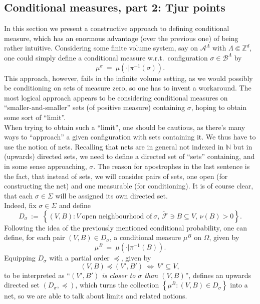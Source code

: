 \documentclass[12pt]{article}
\newcommand{\A}{\mathcal{A}}
\newcommand{\B}{\mathcal{B}}
\newcommand{\F}{\mathcal{F}}
\newcommand{\N}{\mathbb{N}}
\newcommand{\Z}{\mathbb{Z}}
\newcommand{\set}[1]{\left\{#1\right\}}
\newcommand{\pika}{\boldsymbol{\cdot}}
\newcommand{\1}{\mathbbm{1}}
\newcommand{\5}{\vspace{0.5cm}}
\renewcommand{\tilde}{\widetilde}
\theoremstyle{definition}
\begin{document}

\subsection{Conditional measures, part 2: Tjur points}\label{sec:2.3}

In this section we present a constructive approach to defining conditional measure, which has an enormous advantage (over the previous one) of being rather intuitive. Considering some finite volume system, say on $\A^\Lambda$ with $\Lambda\Subset\Z^d$, one could simply define a conditional measure w.r.t.~configuration $\sigma\in\B^\Lambda$ by
$$\mu^\sigma ~=~ \mu(\pika|\pi^{-1}(\sigma)).$$
This approach, however, fails in the infinite volume setting, as we would possibly be conditioning on sets of measure zero, so one has to invent a workaround. The most logical approach appears to be considering conditional measures on ``smaller-and-smaller'' sets (of positive measure) containing $\sigma$, hoping to obtain some sort of ``limit''. \\

When trying to obtain such a ``limit'', one should be cautious, as there's many ways to ``approach'' a given configuration with sets containing it. We thus have to use the notion of nets. Recalling that nets are in general not indexed in $\N$ but in (upwards) directed sets, we need to define a directed set of ``sets'' containing, and in some sense approaching, $\sigma$. The reason for apostrophes in the last sentence is the fact, that instead of sets, we will consider pairs of sets, one open (for constructing the net) and one measurable (for conditioning). It is of course clear, that each $\sigma\in\Sigma$ will be assigned its own directed set.\\

Indeed, fix $\sigma\in\Sigma$ and define
$$D_{\sigma} ~:=~ \set{(V,B):V~\text{open neighbourhood of}~\sigma,\,\tilde{\F}\ni B\subseteq V,\,\nu(B)>0}.$$
Following the idea of the previously mentioned conditional probability, one can define, for each pair $(V,B)\in D_\sigma$, a conditional measure $\mu^B$ on $\Omega$, given by
$$\mu^B ~=~ \mu(\pika|\pi^{-1}(B)).$$	
Equipping $D_\sigma$ with a partial order $\preceq$, given by
$$(V,B)\preceq(V',B') ~\iff~ V'\subseteq V,$$
to be interpreted as ``\textit{$(V',B')$ is closer to $\sigma$ than $(V,B)$}'', defines an upwards directed set $(D_\sigma,\preceq)$, which turns the collection $\set{\mu^B:(V,B)\in D_\sigma}$ into a net, so we are able to talk about limits and related notions. \\
\end{document}
